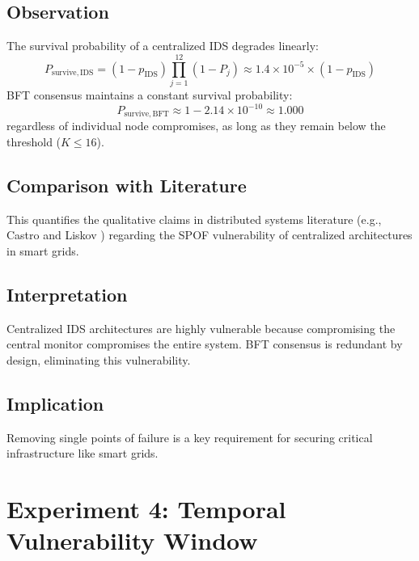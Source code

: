 \documentclass[12pt, oneside, a4paper]{report}
\theoremstyle{definition}
\theoremstyle{remark}
\begin{document}
\subsection{Observation}
The survival probability of a centralized IDS degrades linearly:
\begin{equation}
P_{\mathrm{survive,IDS}} = (1 - p_{\mathrm{IDS}}) \prod_{j=1}^{12}(1 - P_j) \approx 1.4 \times 10^{-5} \times (1 - p_{\mathrm{IDS}})
\end{equation}
BFT consensus maintains a constant survival probability:
\begin{equation}
P_{\mathrm{survive,BFT}} \approx 1 - 2.14 \times 10^{-10} \approx 1.000
\end{equation}
regardless of individual node compromises, as long as they remain below the threshold ($K \le 16$).

\subsection{Comparison with Literature}
This quantifies the qualitative claims in distributed systems literature (e.g., Castro and Liskov \cite{castro1999}) regarding the SPOF vulnerability of centralized architectures in smart grids.

\subsection{Interpretation}
Centralized IDS architectures are highly vulnerable because compromising the central monitor compromises the entire system. BFT consensus is redundant by design, eliminating this vulnerability.

\subsection{Implication}
Removing single points of failure is a key requirement for securing critical infrastructure like smart grids.

\bigskip

\section{Experiment 4: Temporal Vulnerability Window}
\label{sec:res:e4}
\end{document}
